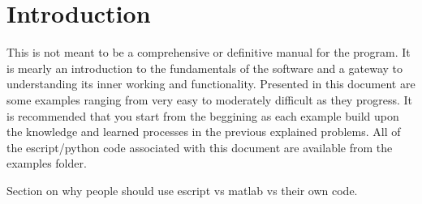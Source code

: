 
%
%
%

\section{Introduction}

\begin{editor}
This is not meant to be a comprehensive or definitive manual for the \esc  program. It is mearly an introduction to the fundamentals of the software and a gateway to understanding its inner working and functionality.
Presented in this document are some examples ranging from very easy to moderately difficult as they progress.
It is recommended that you start from the beggining as each example build upon the knowledge and learned processes in the previous explained problems.
All of the escript/python code associated with this document are available from the examples folder.

Section on why people should use escript vs matlab vs their own code.
\end{editor}

